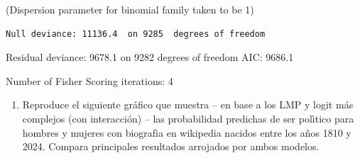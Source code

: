 \documentclass[
  12pt,
  a4paper,
]{article}
\providecommand{\tightlist}{%
  \setlength{\itemsep}{0pt}\setlength{\parskip}{0pt}}
\begin{document}
(Dispersion parameter for binomial family taken to be 1)

\begin{verbatim}
Null deviance: 11136.4  on 9285  degrees of freedom
\end{verbatim}

Residual deviance: 9678.1 on 9282 degrees of freedom
AIC: 9686.1

Number of Fisher Scoring iterations: 4

\begin{enumerate}
\def\labelenumi{\arabic{enumi}.}
\setcounter{enumi}{1}
\tightlist
\item
  Reproduce el siguiente gráfico que muestra -- en base a los LMP y logit más complejos (con interacción) -- las probabilidad predichas de ser polìtico para hombres y mujeres con biografìa en wikipedia nacidos entre los años 1810 y 2024. Compara principales resultados arrojados por ambos modelos.
\end{enumerate}
\end{document}
